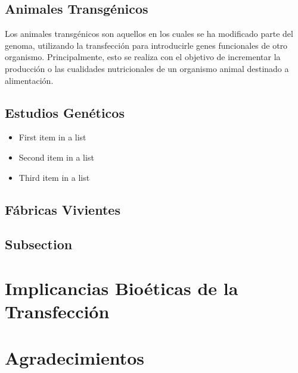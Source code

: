 \documentclass[fleqn,10pt]{SelfArx} %
\begin{document}
\subsection{Animales Transgénicos}

Los animales transgénicos son aquellos en los cuales se ha modificado parte del genoma, utilizando la transfección para introducirle genes funcionales de otro organismo. Principalmente, esto se realiza con el objetivo de incrementar la producción o las cualidades nutricionales de un organismo animal destinado a alimentación.


\subsection{Estudios Genéticos}


\begin{itemize}[noitemsep] %
\item First item in a list
\item Second item in a list
\item Third item in a list
\end{itemize}

\subsection{Fábricas Vivientes}


\subsection{Subsection}



\section{Implicancias Bioéticas de la Transfección}


\section*{Agradecimientos} %
\end{document}
